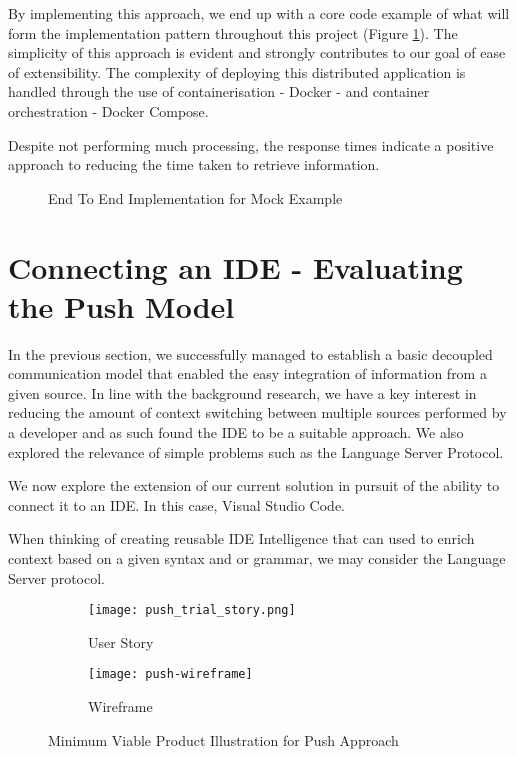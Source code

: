 By implementing this approach, we end up with a core code example of what will form the implementation pattern throughout this project (Figure \ref{fig:e2eMockClass}). The simplicity of this approach is evident and strongly contributes to our goal of ease of extensibility. The complexity of deploying this distributed application is handled through the use of containerisation - Docker - and container orchestration - Docker Compose. 

Despite not performing much processing, the response times indicate a positive approach to reducing the time taken to retrieve information.



\begin{figure}[h!]
	\centering
	
	\caption{End To End Implementation for Mock Example}
	\label{fig:e2eMockClass}
\end{figure}

\section{Connecting an IDE - Evaluating the Push Model}

In the previous section, we successfully managed to establish a basic decoupled communication model that enabled the easy integration of information from a given source. In line with the background research, we have a key interest in reducing the amount of context switching between multiple sources performed by a developer and as such found the IDE to be a suitable approach. We also explored the relevance of simple problems such as the Language Server Protocol. 

We now explore the extension of our current solution in pursuit of the ability to connect it to an IDE. In this case, Visual Studio Code. 

When thinking of creating reusable IDE Intelligence that can used to enrich context based on a given syntax and or grammar, we may consider the Language Server protocol. 

\begin{figure}[h!]
	\centering
	\begin{subfigure}[t]{0.3\textwidth}
		\texttt{[image: push\_trial\_story.png]}
		\caption{User Story}
	\end{subfigure}
	\begin{subfigure}[t]{0.6\textwidth}
		\texttt{[image: push-wireframe]}
		\caption{Wireframe}
	\end{subfigure}
	\label{fig:mvpPush}
	\caption{Minimum Viable Product Illustration for Push Approach}
\end{figure}

